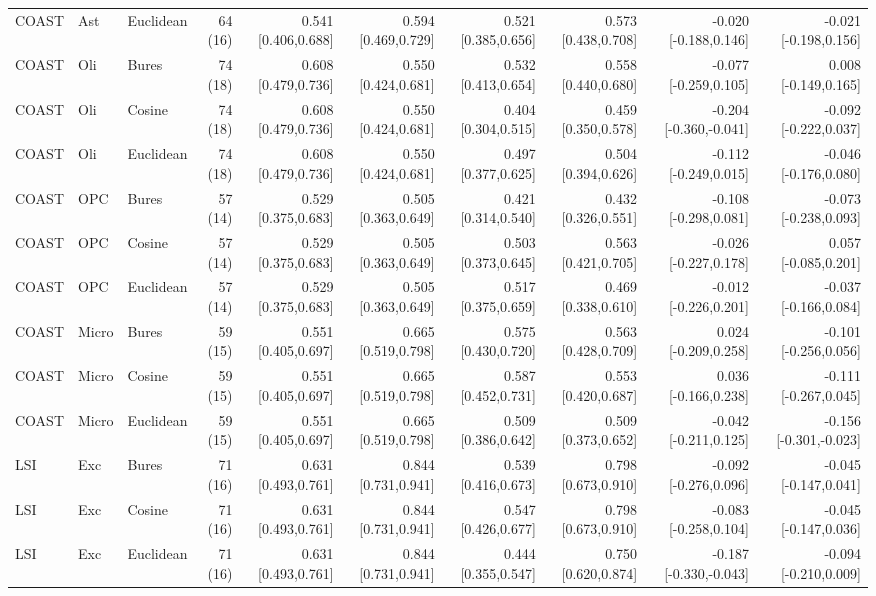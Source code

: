 \documentclass[9pt]{article}
\begin{document}
\begin{landscape}
\begin{longtable}{lllrrrrrrr}
COAST & Ast & Euclidean & 64 (16) & 0.541 [0.406,0.688] & 0.594 [0.469,0.729] & 0.521 [0.385,0.656] & 0.573 [0.438,0.708] & -0.020 [-0.188,0.146] & -0.021 [-0.198,0.156] \\
COAST & Oli & Bures & 74 (18) & 0.608 [0.479,0.736] & 0.550 [0.424,0.681] & 0.532 [0.413,0.654] & 0.558 [0.440,0.680] & -0.077 [-0.259,0.105] & 0.008 [-0.149,0.165] \\
COAST & Oli & Cosine & 74 (18) & 0.608 [0.479,0.736] & 0.550 [0.424,0.681] & 0.404 [0.304,0.515] & 0.459 [0.350,0.578] & -0.204 [-0.360,-0.041] & -0.092 [-0.222,0.037] \\
COAST & Oli & Euclidean & 74 (18) & 0.608 [0.479,0.736] & 0.550 [0.424,0.681] & 0.497 [0.377,0.625] & 0.504 [0.394,0.626] & -0.112 [-0.249,0.015] & -0.046 [-0.176,0.080] \\
COAST & OPC & Bures & 57 (14) & 0.529 [0.375,0.683] & 0.505 [0.363,0.649] & 0.421 [0.314,0.540] & 0.432 [0.326,0.551] & -0.108 [-0.298,0.081] & -0.073 [-0.238,0.093] \\
COAST & OPC & Cosine & 57 (14) & 0.529 [0.375,0.683] & 0.505 [0.363,0.649] & 0.503 [0.373,0.645] & 0.563 [0.421,0.705] & -0.026 [-0.227,0.178] & 0.057 [-0.085,0.201] \\
COAST & OPC & Euclidean & 57 (14) & 0.529 [0.375,0.683] & 0.505 [0.363,0.649] & 0.517 [0.375,0.659] & 0.469 [0.338,0.610] & -0.012 [-0.226,0.201] & -0.037 [-0.166,0.084] \\
COAST & Micro & Bures & 59 (15) & 0.551 [0.405,0.697] & 0.665 [0.519,0.798] & 0.575 [0.430,0.720] & 0.563 [0.428,0.709] & 0.024 [-0.209,0.258] & -0.101 [-0.256,0.056] \\
COAST & Micro & Cosine & 59 (15) & 0.551 [0.405,0.697] & 0.665 [0.519,0.798] & 0.587 [0.452,0.731] & 0.553 [0.420,0.687] & 0.036 [-0.166,0.238] & -0.111 [-0.267,0.045] \\
COAST & Micro & Euclidean & 59 (15) & 0.551 [0.405,0.697] & 0.665 [0.519,0.798] & 0.509 [0.386,0.642] & 0.509 [0.373,0.652] & -0.042 [-0.211,0.125] & -0.156 [-0.301,-0.023] \\
LSI & Exc & Bures & 71 (16) & 0.631 [0.493,0.761] & 0.844 [0.731,0.941] & 0.539 [0.416,0.673] & 0.798 [0.673,0.910] & -0.092 [-0.276,0.096] & -0.045 [-0.147,0.041] \\
LSI & Exc & Cosine & 71 (16) & 0.631 [0.493,0.761] & 0.844 [0.731,0.941] & 0.547 [0.426,0.677] & 0.798 [0.673,0.910] & -0.083 [-0.258,0.104] & -0.045 [-0.147,0.036] \\
LSI & Exc & Euclidean & 71 (16) & 0.631 [0.493,0.761] & 0.844 [0.731,0.941] & 0.444 [0.355,0.547] & 0.750 [0.620,0.874] & -0.187 [-0.330,-0.043] & -0.094 [-0.210,0.009] \\

\end{longtable}
\end{landscape}
\end{document}
